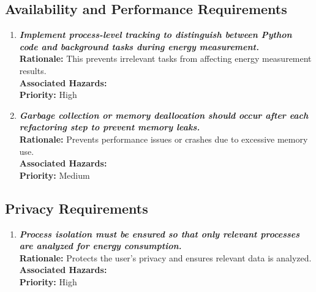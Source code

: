 \documentclass{article}
\begin{document}
\subsection{Availability and Performance Requirements}
\begin{enumerate}[label=SR-AV \arabic*., wide=0pt, leftmargin=*]
    \item \emph{\textbf{Implement process-level tracking to distinguish between Python code and background tasks during energy measurement.}}\\[2mm]
    {\bf Rationale:} This prevents irrelevant tasks from affecting energy measurement results.\\
    {\bf Associated Hazards:} \\
    {\bf Priority:} High
    \item \emph{\textbf{Garbage collection or memory deallocation should occur after each refactoring step to prevent memory leaks.}}\\[2mm]
    {\bf Rationale:} Prevents performance issues or crashes due to excessive memory use.\\
    {\bf Associated Hazards:} \\
    {\bf Priority:} Medium
\end{enumerate}

\subsection{Privacy Requirements}
\begin{enumerate}[label=SR-PR \arabic*., wide=0pt, leftmargin=*]
    \item \emph{\textbf{Process isolation must be ensured so that only relevant processes are analyzed for energy consumption.}}\\[2mm]
    {\bf Rationale:} Protects the user's privacy and ensures relevant data is analyzed.\\
    {\bf Associated Hazards:} \\
    {\bf Priority:} High
\end{enumerate}
\end{document}
